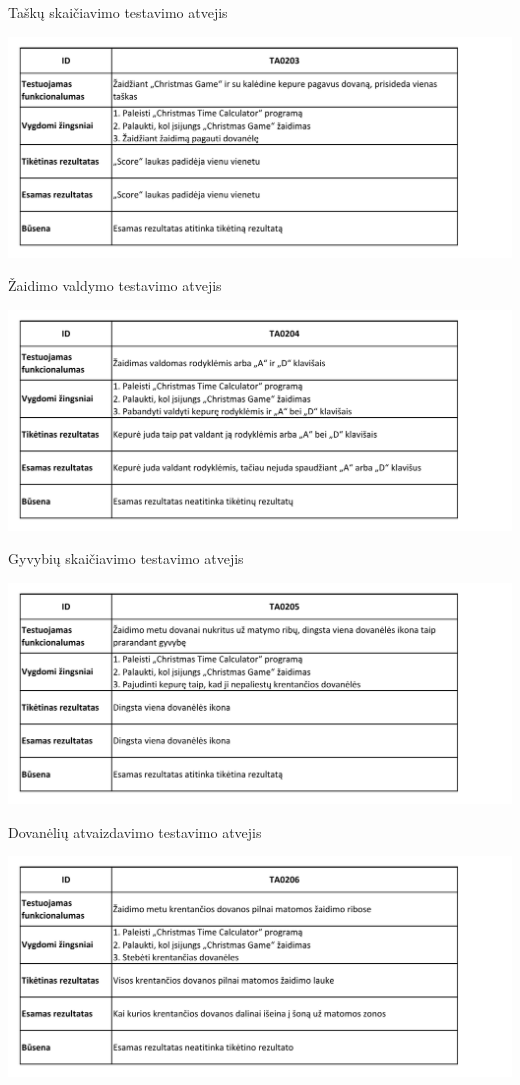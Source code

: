 \documentclass{VUMIFPSkursinis}
\begin{document}
				\begin{table}[H]
					\centering
					\caption{Taškų skaičiavimo testavimo atvejis}
					\includegraphics[width=\textwidth]{TA/TA0203}			
					\label{fig:TA0203}
				\end{table}
				\begin{table}[H]
					\centering
					\caption{Žaidimo valdymo testavimo atvejis}
					\includegraphics[width=\textwidth]{TA/TA0204}			
					\label{fig:TA0204}
				\end{table}
				\begin{table}[H]
					\centering
					\caption{Gyvybių skaičiavimo testavimo atvejis}
					\includegraphics[width=\textwidth]{TA/TA0205}			
					\label{fig:TA0205}
				\end{table}
				\begin{table}[H]
					\centering
					\caption{Dovanėlių atvaizdavimo testavimo atvejis}
					\includegraphics[width=\textwidth]{TA/TA0206}			
					\label{fig:TA0206}
				\end{table}
\end{document}
